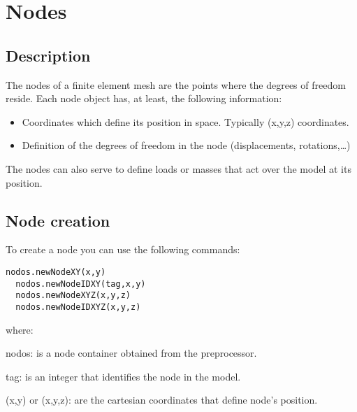 \section{Nodes}

\subsection{Description}
The nodes of a finite element mesh are the points where the degrees of freedom reside. Each node object has, at least, the following information:

\begin{itemize}
\item Coordinates which define its position in space. Typically (x,y,z) coordinates.
\item Definition of the degrees of freedom in the node (displacements, rotations,\ldots)
\end{itemize}

The nodes can also serve to define loads or masses that act over the model at its position.

\subsection{Node creation}

To create a node you can use the following commands:

\begin{lstlisting}[frame=single]
  nodos.newNodeXY(x,y)
  nodos.newNodeIDXY(tag,x,y)
  nodos.newNodeXYZ(x,y,z)
  nodos.newNodeIDXYZ(x,y,z)
\end{lstlisting}

\noindent where:

\begin{description}
\item{nodos:} is a node container obtained from the preprocessor.
\item{tag:} is an integer that identifies the node in the model.
\item{(x,y) or (x,y,z):} are the cartesian coordinates that define node's position.
\end{description}

